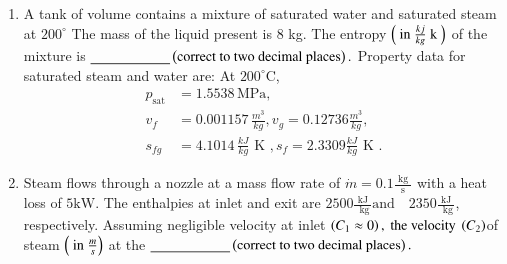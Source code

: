\documentclass[journal]{IEEEtran}
\begin{document}
\begin{enumerate} [start=40]
\bigskip
\item A tank of volume  contains a mixture of saturated water and saturated steam at $200^{\circ}$ The mass of the liquid present is 8 kg. The entropy $\left(\text{ in }\frac{kj}{kg} \text{ k }\right)$  of the mixture is  $\underline{\hspace{2cm}} \left(\text{correct to two decimal places}\right).$
Property data for saturated steam and water are:
At $200^\circ \text{C}$,
\begin{align*}
p_{\text{sat}} &= 1.5538 \, \text{MPa}, \\
v_f &= 0.001157 \, \frac{m^{3}}{kg}, v_g = 0.12736 \frac{m^{3}}{kg}, \\
s_{fg} &= 4.1014 \, \frac{kJ}{kg}\text{ K }, s_f = 2.3309 \frac{kJ}{kg}\text{ K }.
\end{align*}
\bigskip
\item Steam flows through a nozzle at a mass flow rate of $\dot{m} = 0.1 \frac{\text{ kg }}{\text{ s }} $  with a heat loss of $5 \text{kW}$. The enthalpies at inlet and exit are $2500 \frac{\text{ kJ }}{\text{ kg}}  \text{and} \quad 2350 \frac{\text{ kJ }}{\text{ kg}} $, respectively. Assuming negligible velocity at inlet $\left(C_{1}\approx 0\right),\text{ the velocity }\left(C_{2}\right)$of steam $\left(\text{ in }\frac{m}{s}\right)$  at the $\underline{\hspace{2cm}} \left(\text{correct to two decimal places}\right).$
\begin{figure}[H]
\centering
{}%

\end{figure}


\end{enumerate}
\end{document}
